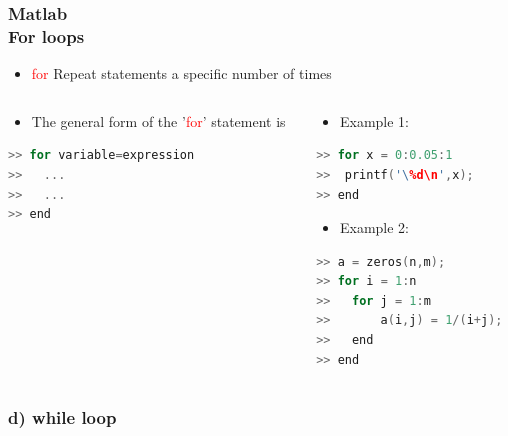 \documentclass[hyperref={pdfpagelabels=true}]{beamer}
\begin{document}
\begin{frame}[fragile]
\frametitle{Matlab \\ {\small For loops}}
 \begin{itemize}
         \item[\ding{60}] \textcolor{red}{for} Repeat statements a specific number of times
         \end{itemize}
\begin{columns}
    \begin{column}{0.58\textwidth}
        \begin{itemize}
         \item[\ding{60}] The general form of the '\textcolor{red}{for}' statement is 
         \end{itemize}
\begin{tcolorbox}
\scriptsize{
\begin{lstlisting}[language=C++,basicstyle=\ttfamily,keywordstyle=\color{red}]
>> for variable=expression
>>   ...
>>   ...
>> end
\end{lstlisting} }
\end{tcolorbox}
      \end{column}
    \begin{column}{0.38\textwidth}
        \begin{itemize}
         \item[\ding{60}] Example 1:
         \end{itemize}
\tiny{
\begin{lstlisting}[language=C++,basicstyle=\ttfamily,keywordstyle=\color{red}]
>> for x = 0:0.05:1
>>  printf('\%d\n',x);
>> end
\end{lstlisting}}
\large{
 \begin{itemize}
         \item[\ding{60}] Example 2:
         \end{itemize}}
\tiny{
\begin{lstlisting}[language=C++,basicstyle=\ttfamily,keywordstyle=\color{red}]
>> a = zeros(n,m);
>> for i = 1:n
>>   for j = 1:m
>>       a(i,j) = 1/(i+j);
>>   end
>> end
\end{lstlisting}}
    \end{column}
\end{columns}
\end{frame}

\subsubsection{d) while loop}
\end{document}
